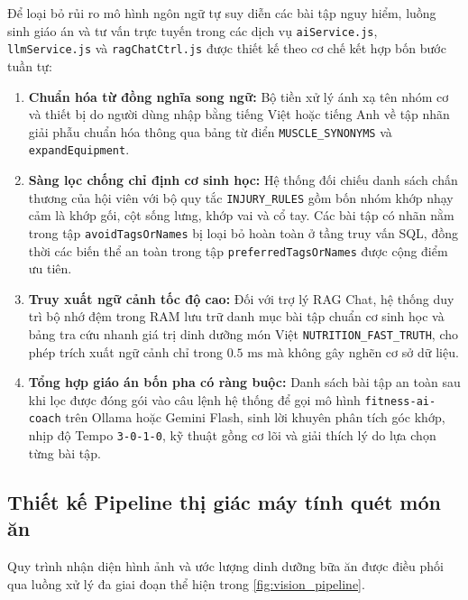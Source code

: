 Để loại bỏ rủi ro mô hình ngôn ngữ tự suy diễn các bài tập nguy hiểm, luồng sinh giáo án và tư vấn trực tuyến trong các dịch vụ \texttt{aiService.js}, \texttt{llmService.js} và \texttt{ragChatCtrl.js} được thiết kế theo cơ chế kết hợp bốn bước tuần tự:
\begin{enumerate}[label=\arabic*.]
    \item \textbf{Chuẩn hóa từ đồng nghĩa song ngữ:} Bộ tiền xử lý ánh xạ tên nhóm cơ và thiết bị do người dùng nhập bằng tiếng Việt hoặc tiếng Anh về tập nhãn giải phẫu chuẩn hóa thông qua bảng từ điển \texttt{MUSCLE\_SYNONYMS} và \texttt{expandEquipment}.
    \item \textbf{Sàng lọc chống chỉ định cơ sinh học:} Hệ thống đối chiếu danh sách chấn thương của hội viên với bộ quy tắc \texttt{INJURY\_RULES} gồm bốn nhóm khớp nhạy cảm là khớp gối, cột sống lưng, khớp vai và cổ tay. Các bài tập có nhãn nằm trong tập \texttt{avoidTagsOrNames} bị loại bỏ hoàn toàn ở tầng truy vấn SQL, đồng thời các biến thể an toàn trong tập \texttt{preferredTagsOrNames} được cộng điểm ưu tiên.
    \item \textbf{Truy xuất ngữ cảnh tốc độ cao:} Đối với trợ lý RAG Chat, hệ thống duy trì bộ nhớ đệm trong RAM lưu trữ danh mục bài tập chuẩn cơ sinh học và bảng tra cứu nhanh giá trị dinh dưỡng món Việt \texttt{NUTRITION\_FAST\_TRUTH}, cho phép trích xuất ngữ cảnh chỉ trong $0.5\text{ ms}$ mà không gây nghẽn cơ sở dữ liệu.
    \item \textbf{Tổng hợp giáo án bốn pha có ràng buộc:} Danh sách bài tập an toàn sau khi lọc được đóng gói vào câu lệnh hệ thống để gọi mô hình \texttt{fitness-ai-coach} trên Ollama hoặc Gemini Flash, sinh lời khuyên phân tích góc khớp, nhịp độ Tempo \texttt{3-0-1-0}, kỹ thuật gồng cơ lõi và giải thích lý do lựa chọn từng bài tập.
\end{enumerate}

\subsection{Thiết kế Pipeline thị giác máy tính quét món ăn}
\label{subsec:pipeline_vision}

Quy trình nhận diện hình ảnh và ước lượng dinh dưỡng bữa ăn được điều phối qua luồng xử lý đa giai đoạn thể hiện trong \cref{fig:vision_pipeline}.

